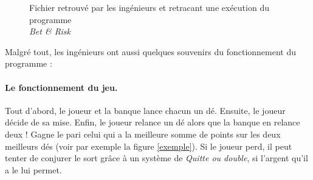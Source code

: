 \documentclass{article}
\begin{document}
\begin{figure}
\begin{center}
\begin{minipage}{10cm}
\begin{multicols}{2}
				{\color{red}{\verb!La banque a aussi tiré un 2 et un 5!}}\\
				{\color{red}{\verb!Votre somme : 3!}}\\
				{\color{red}{\verb!Celle de la banque : 7!}}\\
				{\color{blue}{\verb!Perdu !!}}\\
				{\color{red}{\verb!Quitte ou double ?!}}\\
				{\color{blue}{\verb!double!}}\\
				{\color{red}{\verb!Vous avez maintenant tiré un 5!}}\\
				{\color{red}{\verb!La banque a aussi tiré un 1!}}\\
				{\color{red}{\verb!Votre somme : 7!}}\\
				{\color{red}{\verb!Celle de la banque : 7!}}\\
				{\color{red}{\verb!Egalité !!}}\\
				{\color{red}{\verb!Quitte ou double ?!}}\\
				{\color{blue}{\verb!double!}}\\
				{\color{red}{\verb!Vous avez maintenant tiré un 5!}}\\
				{\color{red}{\verb!La banque a aussi tiré un 2!}}\\
				{\color{red}{\verb!Votre somme : 10!}}\\
				{\color{red}{\verb!Celle de la banque : 7!}}\\
				{\color{red}{\verb!Gagné !!}}\\
				{\color{blue}{\verb!consulter!}}\\
				{\color{red}{\verb!Vous avez 24€!}}\\
				{\color{red}{\verb!terminer!}}\\
				{\color{red}{\verb!Bravo, vous avez doublé votre mise initiale !!}}\\
			\end{multicols}
		\end{minipage}
	\end{center}
	\caption{Fichier retrouvé par les ingénieurs et retracant une exécution du programme \\
				\emph{Bet \& Risk}}
	\label{fichier retrouve}
\end{figure}

\bigskip

Malgré tout, les ingénieurs ont aussi quelques souvenirs du fonctionnement du programme :

\paragraph{Le fonctionnement du jeu.} Tout d'abord, le joueur et la banque lance chacun un dé. Ensuite, le joueur décide de sa mise. Enfin, le joueur relance un dé alors que la banque en relance deux ! Gagne le pari celui qui a la meilleure somme de points sur les deux meilleurs dés (voir par exemple la figure \ref{exemple}). Si le joueur perd, il peut tenter de conjurer le sort grâce à un système de \emph{Quitte ou double}, si l'argent qu'il a le lui permet.
\end{document}
